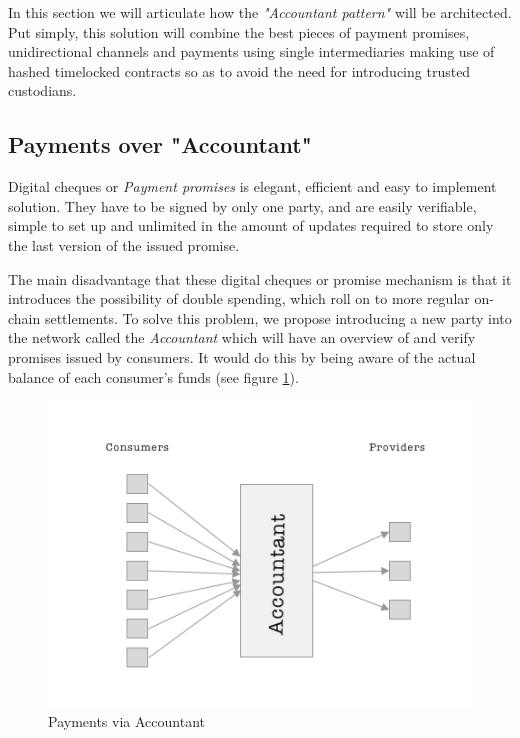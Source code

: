 \documentclass[a4paper,12pt]{article}
\begin{document}
In this section we will articulate how the \textit{"Accountant pattern"} will be 
architected. Put simply, this solution will combine the best pieces of payment 
promises, unidirectional channels and payments using single intermediaries making 
use of hashed timelocked contracts so as to avoid the need for introducing trusted
custodians.

\subsection{Payments over "Accountant"}

Digital cheques or \textit{Payment promises} is elegant, efficient and easy to 
implement solution. They have to be signed by only one party, and are easily 
verifiable, simple to set up and unlimited in the amount of updates required to 
store only the last version of the issued promise.

The main disadvantage that these digital cheques or promise mechanism is that it 
introduces the possibility of double spending, which roll on to more regular 
on-chain settlements. To solve this problem, we propose introducing a new party 
into the network called the \textit{Accountant} which will have an overview of 
and verify promises issued by consumers. It would do this by being aware of the 
actual balance of each consumer’s funds (see figure 
\ref{img:unidirectional-payments}).

\begin{figure}[H]
    \centering
    \includegraphics[scale=0.5]{../img/unidirectional-payments}
    \caption{Payments via Accountant}
    \label{img:unidirectional-payments}
\end{figure}
\end{document}
